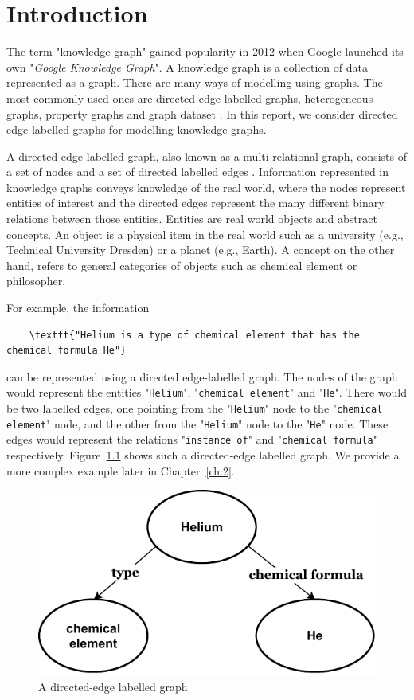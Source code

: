 \chapter{Introduction}
\label{ch:1}
The term "knowledge graph" gained popularity in 2012 when Google launched its own "\textit{Google Knowledge Graph}". A knowledge graph is a collection of data represented as a graph. There are many ways of modelling using graphs. The most commonly used ones are directed edge-labelled graphs, heterogeneous graphs, property graphs and graph dataset \cite{Hogan2021}. In this report, we consider directed edge-labelled graphs for modelling knowledge graphs.

A directed edge-labelled graph, also known as a multi-relational graph, consists of a set of nodes and a set of directed labelled edges \cite{Hogan2021}. Information represented in knowledge graphs conveys knowledge of the real world, where the nodes represent entities of interest and the directed edges represent the many different binary relations between those entities. Entities are real world objects and abstract concepts. An object is a physical item in the real world such as a university (e.g., Technical University Dresden) or a planet (e.g., Earth). A concept on the other hand, refers to general categories of objects such as chemical element or philosopher. 

For example, the information
 \begin{verbatim}
 	\texttt{"Helium is a type of chemical element that has the chemical formula He"}
	\end{verbatim}
can be represented using a directed edge-labelled graph. The nodes of the graph would represent the entities "\texttt{Helium}", "\texttt{chemical element}" and "\texttt{He}". There would be two labelled edges, one pointing from the "\texttt{Helium}" node to the "\texttt{chemical element}" node, and the other from the "\texttt{Helium}" node to the "\texttt{He}" node. These edges would represent the relations "\texttt{instance of}" and "\texttt{chemical formula}" respectively. Figure~\ref{fig:1} shows such a directed-edge labelled graph. We provide a more complex example later in Chapter~\ref{ch:2}.

\begin{figure}[b!tp]
  \centering
  \includegraphics[width=0.75 \linewidth]{images/knowledge_graph.drawio.pdf}
  \caption{A directed-edge labelled graph}
  \label{fig:1}
\end{figure}

